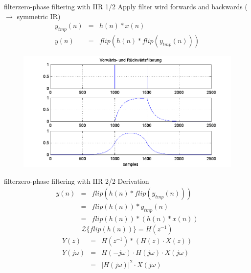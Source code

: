 		\begin{frame}{filter}{zero-phase filtering with IIR 1/2}
			Apply filter wird forwards and backwards ($\rightarrow$ symmetric IR)
			\begin{eqnarray}
				y_{tmp}(n) &=& h(n)*x(n)\\
				y (n) &=& flip(h(n)*flip(y_{tmp}(n)))
			\end{eqnarray}
				\begin{figure}
					\centerline{\includegraphics[scale=.5]{graph/fx_07}}
				    \label{fig:fx_07}
				\end{figure}
		\end{frame}
		\begin{frame}{filter}{zero-phase filtering with IIR 2/2}
			Derivation
			\begin{eqnarray}
				y (n) &=& flip(h(n)*flip(y_{tmp}(n)))\\
					&=& flip(h(n))*y_{tmp}(n)\\
					&=& flip(h(n))*(h(n)*x(n))
			\end{eqnarray}
			\begin{equation}
				\mathcal{Z}\{flip(h(n))\} = H(z^{-1})
			\end{equation}
			\begin{eqnarray}
				Y(z) &=& H(z^{-1})*\left(H(z)\cdot X(z)\right)\\
				Y(j\omega)	&=& H(-j\omega) \cdot H(j\omega) \cdot X(j\omega)\\
					&=& |H(j\omega)|^2\cdot X(j\omega)
			\end{eqnarray}
		\end{frame}
	
